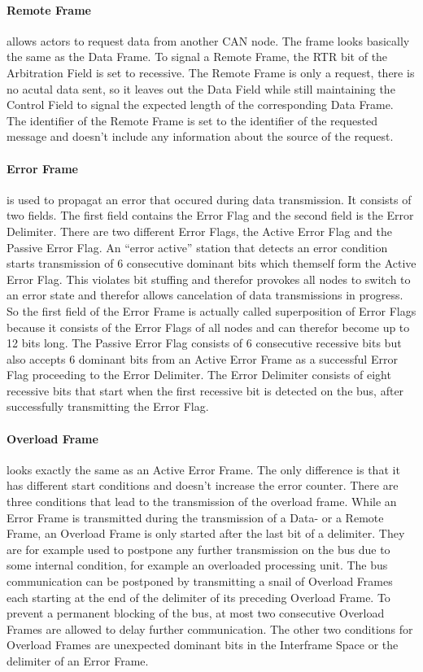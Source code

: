 	\paragraph{Remote Frame} allows actors to request data from another CAN node.
	The frame looks basically the same as the Data Frame. To signal a Remote
	Frame, the RTR bit of the Arbitration Field is set to recessive. The Remote
	Frame is only a request, there is no acutal data sent, so it leaves out the
    Data Field while still maintaining the Control Field to signal the expected
	length of the corresponding Data Frame.
	The identifier of the Remote Frame is set to the identifier of the requested
	message and doesn't include any information about the source of the request.
	
	\paragraph{Error Frame} is used to propagat an error that occured during data
	transmission. It consists of two fields. The first field contains the Error
	Flag and the second field is the Error Delimiter. 
	There are two different Error Flags, the Active Error Flag and the Passive
	Error Flag. An ``error active'' station that detects an error condition starts
	transmission of 6 consecutive dominant bits which themself form the Active
	Error Flag. This violates bit stuffing and therefor provokes all nodes to
	switch to an error state and therefor allows cancelation of data transmissions
	in progress. So the first field of the Error Frame is actually called superposition of Error Flags
	because it consists of the Error Flags of all nodes and can therefor become up
	to 12 bits long.
	The Passive Error Flag consists of 6 consecutive recessive bits but also
	accepts 6 dominant bits from an Active Error Frame as a successful Error Flag
	proceeding to the Error Delimiter.
	The Error Delimiter consists of eight recessive bits that start when the
	first recessive bit is detected on the bus, after successfully transmitting the
	Error Flag.
	
    
    \paragraph{Overload Frame} looks exactly the same as an Active Error Frame.
    The only difference is that it has different start conditions and doesn't
    increase the error counter. There are three conditions that lead to the transmission of the
    overload frame. While an Error Frame is transmitted during the
    transmission of a Data- or a Remote Frame, an Overload Frame is only
    started after the last bit of a delimiter. They are for example used to postpone any
    further transmission on the bus due to some internal condition, for example
    an overloaded processing unit.
    The bus communication can be postponed by transmitting a snail of Overload Frames
    each starting at the end of the delimiter of its preceding Overload Frame.
    To prevent a permanent blocking of the bus, at most two consecutive Overload
    Frames are allowed to delay further communication. The other two conditions for
    Overload Frames are unexpected dominant bits in the Interframe Space or the delimiter of an Error Frame.
    
